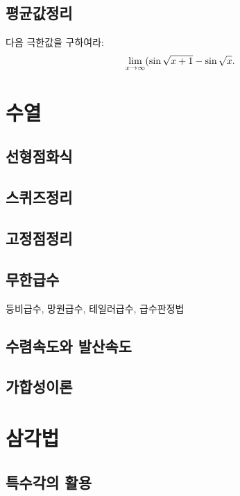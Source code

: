 \documentclass[11pt]{amsbook}
\makeatletter
\newcommand{\+}{\begin{center}$\cdot\qquad\cdot\qquad\cdot\qquad\cdot\qquad\cdot$\end{center}}
\let\@@section\section
\renewcommand{\section}{\newpage\@@section}
\makeatother
\begin{document}
\section{평균값정리}

\begin{prb}
다음 극한값을 구하여라:
\[\lim_{x\to\oo}(\sin\sqrt{x+1}-\sin\sqrt x.\]
\end{prb}







\chapter{수열}

\section{선형점화식}

\section{스퀴즈정리}

\section{고정점정리}

\section{무한급수}
등비급수, 망원급수, 테일러급수, 급수판정법

\section{수렴속도와 발산속도}

\section{가합성이론}











\chapter{삼각법}


\section{특수각의 활용}
\end{document}
